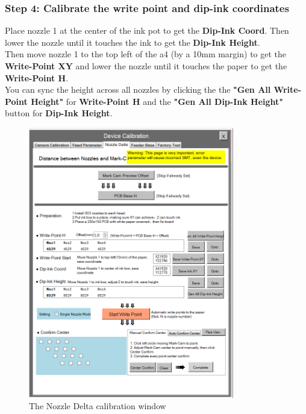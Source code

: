 \documentclass[a4paper,10pt]{report}
\begin{document}
\subsubsection{Step 4: Calibrate the write point and dip-ink coordinates}
Place nozzle 1 at the center of the ink pot to get the \textbf{Dip-Ink Coord}. Then lower the nozzle until it touches the ink to get the \textbf{Dip-Ink Height}.\\
Then move nozzle 1 to the top left of the a4 (by a 10mm margin) to get the \textbf{Write-Point XY} and lower the nozzle until it touches the paper to get the \textbf{Write-Point H}.\\
You can sync the height across all nozzles by clicking the the \textbf{"Gen All Write-Point Height"} for \textbf{Write-Point H} and the \textbf{"Gen All Dip-Ink Height"} button for \textbf{Dip-Ink Height}.
 \begin{figure}[!htb]
 \centering
 \includegraphics[width=0.8\textwidth]{images/scrot35.png}
 \caption{The Nozzle Delta calibration window}
\end{figure}
\newpage
\end{document}
